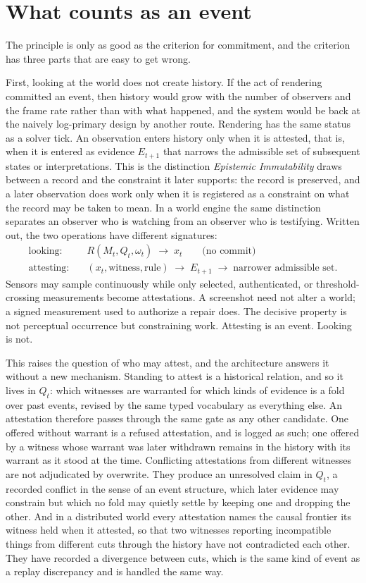 \documentclass[11pt]{article}
\begin{document}
\section{What counts as an event}

The principle is only as good as the criterion for commitment, and the criterion has three parts that are easy to get wrong.

First, looking at the world does not create history. If the act of rendering committed an event, then history would grow with the number of observers and the frame rate rather than with what happened, and the system would be back at the naively log-primary design by another route. Rendering has the same status as a solver tick. An observation enters history only when it is attested, that is, when it is entered as evidence $E_{t+1}$ that narrows the admissible set of subsequent states or interpretations. This is the distinction \emph{Epistemic Immutability} draws between a record and the constraint it later supports: the record is preserved, and a later observation does work only when it is registered as a constraint on what the record may be taken to mean. In a world engine the same distinction separates an observer who is watching from an observer who is testifying. Written out, the two operations have different signatures:
\begin{align*}
\text{looking:}\quad & R(M_t, Q_t, \omega_t) \;\to\; x_t \qquad \text{(no commit)} \\
\text{attesting:}\quad & (x_t, \text{witness}, \text{rule}) \;\to\; E_{t+1} \;\to\; \text{narrower admissible set}.
\end{align*}
Sensors may sample continuously while only selected, authenticated, or threshold-crossing measurements become attestations. A screenshot need not alter a world; a signed measurement used to authorize a repair does. The decisive property is not perceptual occurrence but constraining work. Attesting is an event. Looking is not.

This raises the question of who may attest, and the architecture answers it without a new mechanism. Standing to attest is a historical relation, and so it lives in $Q_t$: which witnesses are warranted for which kinds of evidence is a fold over past events, revised by the same typed vocabulary as everything else. An attestation therefore passes through the same gate as any other candidate. One offered without warrant is a refused attestation, and is logged as such; one offered by a witness whose warrant was later withdrawn remains in the history with its warrant as it stood at the time. Conflicting attestations from different witnesses are not adjudicated by overwrite. They produce an unresolved claim in $Q_t$, a recorded conflict in the sense of an event structure, which later evidence may constrain but which no fold may quietly settle by keeping one and dropping the other. And in a distributed world every attestation names the causal frontier its witness held when it attested, so that two witnesses reporting incompatible things from different cuts through the history have not contradicted each other. They have recorded a divergence between cuts, which is the same kind of event as a replay discrepancy and is handled the same way.
\end{document}
